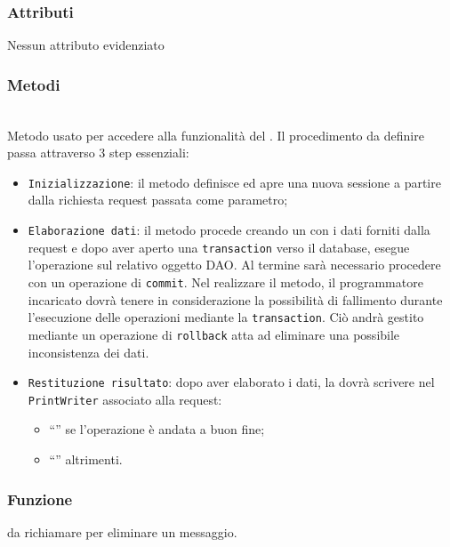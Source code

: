 \subsubsection*{Attributi}

Nessun attributo evidenziato

\subsubsection*{Metodi}
\begin{description}
	
	\item{}\\
	Metodo usato per accedere alla funzionalità del . Il procedimento da definire passa attraverso 3 step essenziali:
	\begin{itemize}
		\item \texttt{Inizializzazione}: il metodo definisce ed apre una nuova sessione a partire dalla richiesta request passata come parametro;
		\item \texttt{Elaborazione dati}: il metodo procede creando un  con i dati forniti dalla request e dopo aver aperto una \texttt{transaction} verso il database, esegue l'operazione  sul relativo oggetto DAO. Al termine sarà necessario procedere con un operazione di \texttt{commit}. Nel realizzare il metodo, il programmatore incaricato dovrà tenere in considerazione la possibilità di fallimento durante l'esecuzione delle operazioni mediante la \texttt{transaction}. Ciò andrà gestito mediante un operazione di \texttt{rollback} atta ad eliminare una possibile inconsistenza dei dati.
		\item \texttt{Restituzione risultato}: dopo aver elaborato i dati, la  dovrà scrivere nel \texttt{PrintWriter} associato alla request:
			\begin{itemize}
				\item ``'' se l'operazione è andata a buon fine;
				\item ``'' altrimenti.
			\end{itemize}
	\end{itemize}

\end{description}


\subsubsection*{Funzione}
 da richiamare per eliminare un messaggio.

